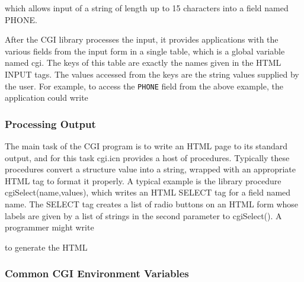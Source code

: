 
\noindent
which allows input of a string of length up to 15 characters into a
field named \textsf{PHONE}.

After the CGI library processes the input, it provides applications with
the various fields from the input form in a single table, which is a
global variable named \textsf{cgi}. The keys of this table are exactly
the names given in the HTML \textsf{INPUT} tags. The values accessed
from the keys are the string values supplied by the user. For example,
to access the \texttt{PHONE} field from the above example, the
application could write 


\subsubsection{Processing Output }
The main task of the CGI program is to write an HTML page to its
standard output, and for this task \textsf{cgi.icn} provides a host of
procedures. Typically these procedures convert a structure value into a
string, wrapped with an appropriate HTML tag to format it properly. A
typical example is the library procedure
\textsf{cgiSelect(name,values)}, which writes an HTML \textsf{SELECT}
tag for a field named name. The \textsf{SELECT} tag creates a list of
radio buttons on an HTML form whose labels are given by a list of
strings in the second parameter to \textsf{cgiSelect()}. A programmer
might write


to generate the HTML


\subsubsection[Common CGI Environment Variables]{Common CGI Environment
Variables}

